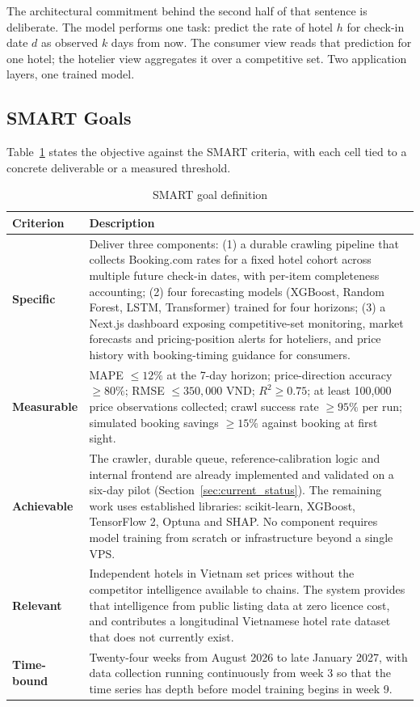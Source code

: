 The architectural commitment behind the second half of that sentence is deliberate. The model performs one task: predict the rate of hotel $h$ for check-in date $d$ as observed $k$ days from now. The consumer view reads that prediction for one hotel; the hotelier view aggregates it over a competitive set. Two application layers, one trained model.

\subsection{SMART Goals}

Table~\ref{tab:smart_goals} states the objective against the SMART criteria, with each cell tied to a concrete deliverable or a measured threshold.

\begin{table}[!htbp]
\centering
\caption{SMART goal definition}
\label{tab:smart_goals}
\begin{tabular}{|p{2.5cm}|p{11cm}|}
\hline
\textbf{Criterion} & \textbf{Description} \\
\hline
\textbf{Specific} & Deliver three components: (1) a durable crawling pipeline that collects Booking.com rates for a fixed hotel cohort across multiple future check-in dates, with per-item completeness accounting; (2) four forecasting models (XGBoost, Random Forest, LSTM, Transformer) trained for four horizons; (3) a Next.js dashboard exposing competitive-set monitoring, market forecasts and pricing-position alerts for hoteliers, and price history with booking-timing guidance for consumers. \\
\hline
\textbf{Measurable} & MAPE $\leq 12\%$ at the 7-day horizon; price-direction accuracy $\geq 80\%$; RMSE $\leq 350{,}000$ VND; $R^2 \geq 0.75$; at least 100,000 price observations collected; crawl success rate $\geq 95\%$ per run; simulated booking savings $\geq 15\%$ against booking at first sight. \\
\hline
\textbf{Achievable} & The crawler, durable queue, reference-calibration logic and internal frontend are already implemented and validated on a six-day pilot (Section~\ref{sec:current_status}). The remaining work uses established libraries: scikit-learn, XGBoost, TensorFlow 2, Optuna and SHAP. No component requires model training from scratch or infrastructure beyond a single VPS. \\
\hline
\textbf{Relevant} & Independent hotels in Vietnam set prices without the competitor intelligence available to chains. The system provides that intelligence from public listing data at zero licence cost, and contributes a longitudinal Vietnamese hotel rate dataset that does not currently exist. \\
\hline
\textbf{Time-bound} & Twenty-four weeks from August 2026 to late January 2027, with data collection running continuously from week 3 so that the time series has depth before model training begins in week 9. \\
\hline
\end{tabular}
\end{table}

